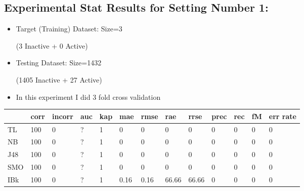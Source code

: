 \documentclass[a4paper,12pt, english]{article}
\begin{document}
\newpage

\subsection{Experimental Stat Results for Setting Number 1:}
\begin{itemize}
\item Target (Training) Dataset: Size=3 \begin{scriptsize}(3 Inactive + 0 Active)\end{scriptsize}
\item Testing Dataset: Size=1432 \begin{scriptsize}(1405 Inactive + 27 Active)\end{scriptsize}
\item In this experiment I did 3 fold cross validation
\end{itemize}  

\begin{small}
\begin{center}
    \begin{tabular}{ | l | l | l | l | l | l | l | l | l | l | l | l | l |}
    \hline
      	& corr & incorr  & auc & kap & mae & rmse & rae & rrse & prec & rec & fM & err rate\\ \hline
      	TL & 100 & 0 & ? & 1 & 0 & 0 & 0 & 0 & 0 & 0 & 0 & 0\\ \hline
	NB & 100 & 0 & ? & 1 & 0 & 0 & 0 & 0 & 0 & 0 & 0 & 0\\ \hline
	J48 & 100 & 0 & ? & 1 & 0 & 0 & 0 & 0 & 0 & 0 & 0 & 0\\ \hline
	SMO & 100 & 0 & ? & 1 & 0 & 0 & 0 & 0 & 0 & 0 & 0 & 0\\ \hline
	IBk & 100 & 0 & ? & 1 & 0.16 & 0.16 & 66.66 & 66.66 & 0 & 0 & 0 & 0\\ \hline  
    \end{tabular}       
\end{center}
\end{small}
\end{document}
